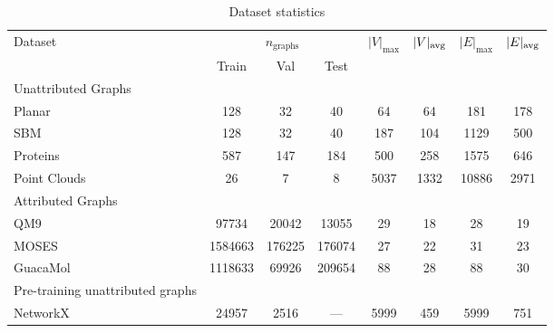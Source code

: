 \begin{table}[ht]
    \centering
    \caption{Dataset statistics}
    \label{app:tab:datasets}
    \begin{sc}
    \begin{tabular}{lccccccc} \toprule
        Dataset & \multicolumn{3}{c}{$n_{\mathrm{graphs}}$} & $|V|_{\max}$ & $|V|_{\operatorname*{avg}}$ & $|E|_{\max}$ & $|E|_{\operatorname*{avg}}$ \\ \cmidrule{2-4}
        & Train & Val & Test & \\ \midrule
        Unattributed Graphs \\
        Planar & 128 & 32 & 40 & 64 & 64 & 181 & 178 \\ 
        SBM & 128 & 32 & 40 & 187 & 104 & 1129 & 500 \\
        Proteins & 587 & 147 & 184 & 500 & 258 & 1575 & 646 \\
        Point Clouds & 26 & 7 & 8 & 5037 & 1332 & 10886 & 2971 \\ \midrule
        Attributed Graphs \\
        QM9 & 97734 & 20042 & 13055 & 29 & 18 & 28 & 19 \\
        MOSES & 1584663 & 176225 & 176074 & 27 & 22 & 31 & 23  \\
        GuacaMol & 1118633 & 69926 & 209654 & 88 & 28 & 88 & 30  \\ \midrule
        Pre-training unattributed graphs \\
        NetworkX & 24957 & 2516 & --- & 5999 & 459 & 5999 & 751 \\ 
        \bottomrule
    \end{tabular}
    \end{sc}
\end{table}

